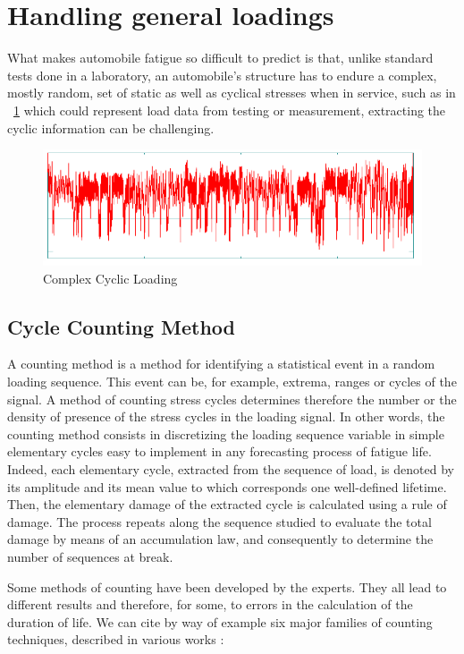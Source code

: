 \documentclass[3p,times,procedia,number]{elsarticle}
\newcommand{\figref}[1]{\figurename~\ref{#1}}
\begin{document}
\section{Handling general loadings}

What makes automobile fatigue so difficult to predict is that, unlike standard tests done in a laboratory, an automobile's structure has to endure a complex, mostly random, set of static as well as cyclical stresses when in service, such as in \figref{complexloading} which could represent load data from testing or measurement, extracting the cyclic information can be challenging. 

\begin{figure}[h!]
	\centering
	\includegraphics[width=\textwidth]{figures//complexloading.png} 
	\caption{Complex Cyclic Loading}
	\label{complexloading}
\end{figure}


\subsection{Cycle Counting Method}
A counting method is a method for identifying a statistical event
in a random loading sequence. This event can be, for example, extrema,
ranges or cycles of the signal. A method of counting stress cycles determines
therefore the number or the density of presence of the stress cycles in the loading signal.
In other words, the counting method consists in discretizing the loading sequence
variable in simple elementary cycles easy to implement in any forecasting process
of fatigue life. Indeed, each elementary cycle, extracted from the sequence of
load, is denoted by its amplitude and its mean value to which corresponds one
well-defined lifetime. Then, the elementary damage of the extracted cycle is calculated using
a rule of damage. The process repeats along the sequence studied to evaluate
the total damage by means of an accumulation law, and consequently to determine the number of
sequences at break.

Some methods of counting have been developed by the experts. They all lead to different results and therefore, for some, to errors in the calculation of the duration of life. We can cite by way of example six major families of counting techniques,
described in various works \cite{ASTM1985}:
\end{document}
